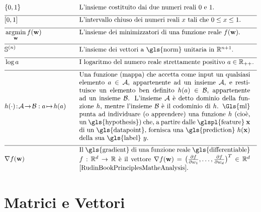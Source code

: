 \newpage
\begin{align}
		&\{0,1\}& \quad & \mbox{L'insieme costituito dai due numeri reali $0$ e $1$.} \nonumber \\[2mm] \hline \nonumber\\[-5mm]
	&[0,1] &\quad &\mbox{L'intervallo chiuso dei numeri reali $x$ tali che $0 \leq x \leq 1$. }\nonumber \\[2mm] \hline \nonumber\\[-5mm]
    &\argmin_{\weights} f(\weights) &\quad &\mbox{L'insieme dei minimizzatori di una funzione reale $f(\weights)$.  } \nonumber \\[2mm] \hline \nonumber\\[-5mm]
    &\sphere{\nrnodes} &\quad &\mbox{L'insieme dei vettori a \gls{norm} unitaria in $\mathbb{R}^{\nrnodes+1}$.  }\nonumber \\[2mm] \hline \nonumber\\[-5mm]
	 &\log a &\quad &\mbox{I logaritmo del numero reale strettamente positivo $a \in \mathbb{R}_{++}$.  } \nonumber \\[2mm] \hline \nonumber\\[-5mm]
	 &\hypothesis(\cdot)\!:\!\mathcal{A}\!\rightarrow\!\mathcal{B} :  a \!\mapsto\!h(a) &\quad &\parbox{.75\textwidth}{
	 	Una funzione (mappa) che accetta come input un qualsiasi elemento $a \in \mathcal{A}$, appartenente ad un insieme $\mathcal{A}$, e restituisce un elemento ben definito $h(a) \in \mathcal{B}$, appartenente ad un insieme $\mathcal{B}$. 
	 	L'insieme $\mathcal{A}$ è detto dominio della funzione $h$, mentre l'insieme $\mathcal{B}$ è il codominio di $\hypothesis$. \Gls{ml} punta ad individuare (o apprendere) una funzione $\hypothesis$ (cioè, un \gls{hypothesis}) che, a partire dalle \glspl{feature} $\featurevec$ di un \gls{datapoint}, fornisca una \gls{prediction} $\hypothesis(\featurevec)$
	 	della sua \gls{label} $\truelabel$.} \nonumber \\[2mm] \hline \nonumber\\[-5mm]
	 	&\nabla f(\weights) & \quad & \parbox{.75\textwidth}{Il \gls{gradient} di una funzione reale \gls{differentiable}
	 	$f: \mathbb{R}^{\featuredim}\rightarrow \mathbb{R}$ è il vettore
	 	$\nabla f(\weights) = \big( \frac{\partial f}{\partial \weight_{1}},\ldots,\frac{\partial f}{\partial \weight_{\featuredim}}  \big)^{T} \in \mathbb{R}^{\featuredim}$ \cite[Ch. 9]{RudinBookPrinciplesMatheAnalysis}.}   \nonumber
\end{align} 
\section*{Matrici e Vettori} 

